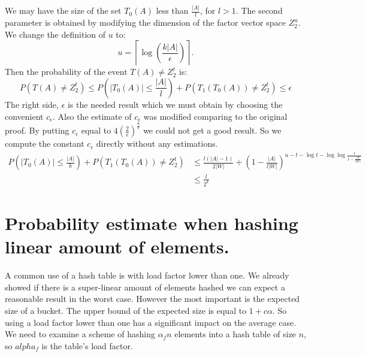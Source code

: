 We may have the size of the set $T_0(A)$ less than $\frac{|A|}{l}$, for $l > 1$. The second parameter is obtained by modifying the dimension of the factor vector space $Z_2^u$. We change the definition of $u$ to:
\begin{displaymath}
u = \left\lceil \log \left(\frac{k |A|}{\epsilon}\right) \right\rceil \textit{.}
\end{displaymath}
Then the probability of the event $T(A) \neq Z_2^t$ is:
\begin{displaymath}
P(T(A) \neq Z_2^t) \leq P(|T_0(A)| \leq \frac{|A|}{l}) + P(T_1(T_0(A)) \neq Z_2^t) \leq \epsilon
\end{displaymath}
The right side, $\epsilon$ is the needed result which we must obtain by choosing the convenient $c_{\epsilon}$. Also the estimate of $c_{\epsilon}$ was modified comparing to the original proof. By putting $c_{\epsilon}$ equal to $4\left(\frac{2}{\epsilon}\right)^{\frac{8}{\epsilon}}$ we could not get a good result. So we compute the constant $c_{\epsilon}$ directly without any estimations.
\begin{displaymath}
\begin{split}
P(|T_0(A)| \leq \frac{|A|}{k}) + P(T_1(T_0(A)) \neq Z_2^t) 
& \leq \frac{l(|A| - 1)}{2|W|} + \left(1 - \frac{|A|}{l|W|}\right)^{u - t - \log t - \log \log \frac{1}{1 - \frac{|A|}{l|W|}}} \\
& \leq \frac{l}{2^k}
\end{split}
\end{displaymath}

\section{Probability estimate when hashing linear amount of elements.}
A common use of a hash table is with load factor lower than one. We already showed if there is a super-linear amount of elements hashed we can expect a reasonable result in the worst case. However the most important is the expected size of a bucket. The upper bound of the expected size is equal to $1 + c \alpha$. So using a load factor lower than one has a significant impact on the average case. We need to examine a scheme of hashing $\alpha_f n$ elements into a hash table of size $n$, so $alpha_f$ is the table's load factor. 

